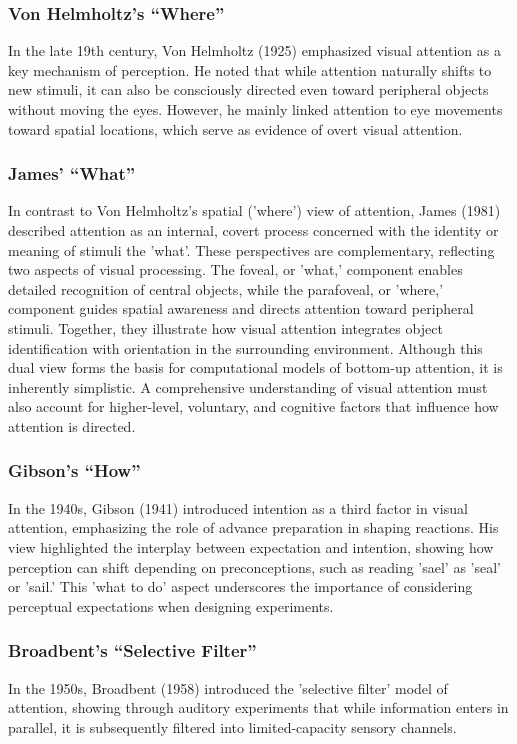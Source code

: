 \documentclass{article}
\begin{document}
\subsubsection{Von Helmholtz's “Where”}
In the late 19th century, Von Helmholtz (1925) emphasized visual attention as a key mechanism of perception. 
He noted that while attention naturally shifts to new stimuli, it can also be consciously directed even toward peripheral objects without moving the eyes. 
However, he mainly linked attention to eye movements toward spatial locations, which serve as evidence of overt visual attention.

\subsubsection{James' “What”}
In contrast to Von Helmholtz's spatial ('where') view of attention, James (1981) described attention as an internal, covert process concerned with the identity or meaning of stimuli the 'what'. 
These perspectives are complementary, reflecting two aspects of visual processing.
The foveal, or 'what,' component enables detailed recognition of central objects, while the parafoveal, or 'where,' component guides spatial awareness and directs attention toward peripheral stimuli. 
Together, they illustrate how visual attention integrates object identification with orientation in the surrounding environment.
Although this dual view forms the basis for computational models of bottom-up attention, it is inherently simplistic. 
A comprehensive understanding of visual attention must also account for higher-level, voluntary, and cognitive factors that influence how attention is directed.

\subsubsection{Gibson's “How”}
In the 1940s, Gibson (1941) introduced intention as a third factor in visual attention, emphasizing the role of advance preparation in shaping reactions. 
His view highlighted the interplay between expectation and intention, showing how perception can shift depending on preconceptions, such as reading 'sael' as 'seal' or 'sail.'
This 'what to do' aspect underscores the importance of considering perceptual expectations when designing experiments.

\subsubsection{Broadbent's “Selective Filter”}
In the 1950s, Broadbent (1958) introduced the 'selective filter' model of attention, showing through auditory experiments that while information enters in parallel, it is subsequently filtered into limited-capacity sensory channels.
\end{document}
